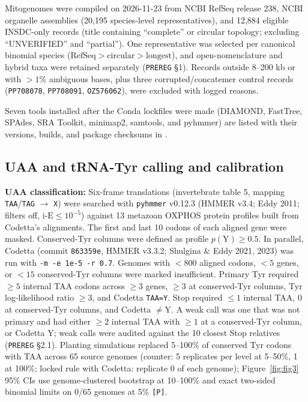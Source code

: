 \documentclass[11pt, a4paper]{article}
\begin{document}
Mitogenomes were compiled on 2026-11-23 from NCBI RefSeq release 238, NCBI organelle assemblies (20,195 species-level representatives), and 12,884 eligible INSDC-only records (title containing ``complete'' or circular topology; excluding ``UNVERIFIED'' and ``partial''). One representative was selected per canonical binomial species ($\mathrm{RefSeq} > \mathrm{circular} > \mathrm{longest}$), and open-nomenclature and hybrid taxa were retained separately (\texttt{PREREG} \S 1). Records outside 8--200 kb or with $>1\%$ ambiguous bases, plus three corrupted/concatemer control records (\texttt{PP708078}, \texttt{PP708091}, \texttt{OZ576062}), were excluded with logged reasons.

Seven tools installed after the Conda lockfiles were made (DIAMOND, FastTree, SPAdes, SRA Toolkit, minimap2, samtools, and pyhmmer) are listed with their versions, builds, and package checksums in .

\subsection{UAA and tRNA-Tyr calling and calibration}
\textbf{UAA classification:} Six-frame translations (invertebrate table 5, mapping \texttt{TAA}/\texttt{TAG} $\to$ \texttt{X}) were searched with \texttt{pyhmmer} v0.12.3 (HMMER v3.4; Eddy 2011; filters off, $\mathrm{i\text{-}E} \le 10^{-5}$) against 13 metazoan OXPHOS protein profiles built from Codetta's alignments. The first and last 10 codons of each aligned gene were masked. Conserved-Tyr columns were defined as profile $p(\mathrm{Y}) \ge 0.5$. In parallel, Codetta (commit \texttt{863359e}, HMMER v3.3.2; Shulgina \& Eddy 2021, 2023) was run with \texttt{-m -e 1e-5 -r 0.7}. Genomes with $<800$ aligned codons, $<5$ genes, or $<15$ conserved-Tyr columns were marked insufficient. Primary Tyr required $\ge 5$ internal TAA codons across $\ge 3$ genes, $\ge 3$ at conserved-Tyr columns, Tyr log-likelihood ratio $\ge 3$, and Codetta \texttt{TAA=Y}. Stop required $\le 1$ internal TAA, 0 at conserved-Tyr columns, and Codetta $\ne \mathrm{Y}$. A weak call was one that was not primary and had either $\ge 2$ internal TAA with $\ge 1$ at a conserved-Tyr column, or Codetta Y; weak calls were audited against the 10 closest Stop relatives (\texttt{PREREG} \S 2.1). Planting simulations replaced 5--100\% of conserved Tyr codons with TAA across 65 source genomes (counter: 5 replicates per level at 5--50\%, 1 at 100\%; locked rule with Codetta: replicate 0 of each genome); Figure~\ref{fig:fig3} 95\% CIs use genome-clustered bootstrap at 10--100\% and exact two-sided binomial limits on 0/65 genomes at 5\% \texttt{[P]}.
\end{document}
